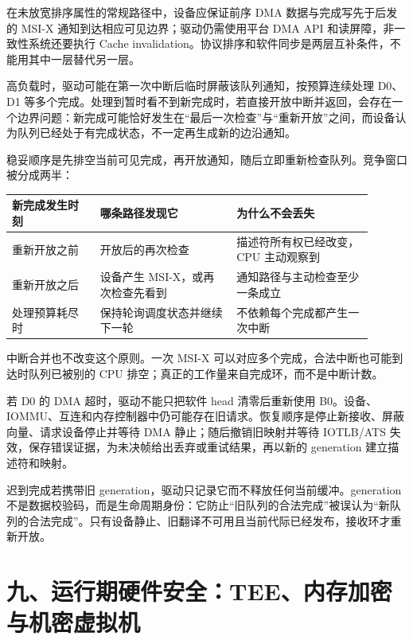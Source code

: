 在未放宽排序属性的常规路径中，设备应保证前序 DMA 数据与完成写先于后发的 MSI-X 通知到达相应可见边界；驱动仍需使用平台 DMA API 和读屏障，非一致性系统还要执行 Cache invalidation。协议排序和软件同步是两层互补条件，不能用其中一层替代另一层。


高负载时，驱动可能在第一次中断后临时屏蔽该队列通知，按预算连续处理 D0、D1 等多个完成。处理到暂时看不到新完成时，若直接开放中断并返回，会存在一个边界问题：新完成可能恰好发生在“最后一次检查”与“重新开放”之间，而设备认为队列已经处于有完成状态，不一定再生成新的边沿通知。

稳妥顺序是先排空当前可见完成，再开放通知，随后立即重新检查队列。竞争窗口被分成两半：

\begin{longtable}{L{0.22\linewidth}L{0.34\linewidth}L{0.34\linewidth}}
\toprule
新完成发生时刻 & 哪条路径发现它 & 为什么不会丢失 \\
\midrule
重新开放之前 & 开放后的再次检查 & 描述符所有权已经改变，CPU 主动观察到 \\\tablerowrule
重新开放之后 & 设备产生 MSI-X，或再次检查先看到 & 通知路径与主动检查至少一条成立 \\\tablerowrule
处理预算耗尽时 & 保持轮询调度状态并继续下一轮 & 不依赖每个完成都产生一次中断 \\
\bottomrule
\end{longtable}

中断合并也不改变这个原则。一次 MSI-X 可以对应多个完成，合法中断也可能到达时队列已被别的 CPU 排空；真正的工作量来自完成环，而不是中断计数。


若 D0 的 DMA 超时，驱动不能只把软件 head 清零后重新使用 B0。设备、IOMMU、互连和内存控制器中仍可能存在旧请求。恢复顺序是停止新接收、屏蔽向量、请求设备停止并等待 DMA 静止；随后撤销旧映射并等待 IOTLB/ATS 失效，保存错误证据，为未决帧给出丢弃或重试结果，再以新的 generation 建立描述符和映射。

迟到完成若携带旧 generation，驱动只记录它而不释放任何当前缓冲。generation 不是数据校验码，而是生命周期身份：它防止“旧队列的合法完成”被误认为“新队列的合法完成”。只有设备静止、旧翻译不可用且当前代际已经发布，接收环才重新开放。
\section{九、运行期硬件安全：TEE、内存加密与机密虚拟机}

